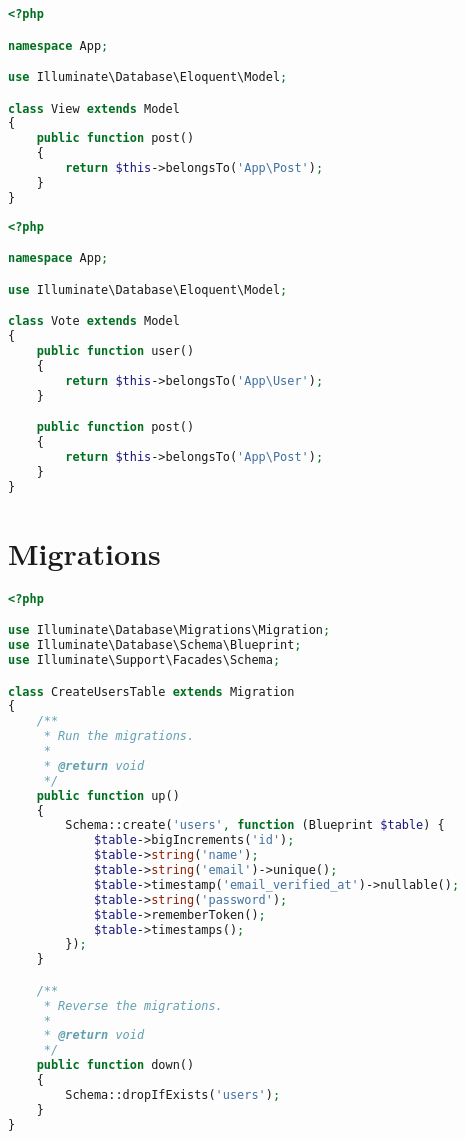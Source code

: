 \documentclass[11pt, oneside]{article}   	%
\begin{document}
\begin{lstlisting}[showstringspaces=false, title=View.java, language=PHP, frame=single]
<?php

namespace App;

use Illuminate\Database\Eloquent\Model;

class View extends Model
{
    public function post()
    {
        return $this->belongsTo('App\Post');
    }
}
\end{lstlisting}

\begin{lstlisting}[showstringspaces=false, title=Vote.java, language=PHP, frame=single]
<?php

namespace App;

use Illuminate\Database\Eloquent\Model;

class Vote extends Model
{
    public function user()
    {
        return $this->belongsTo('App\User');
    }

    public function post()
    {
        return $this->belongsTo('App\Post');
    }
}
\end{lstlisting}

\section{Migrations}

\begin{lstlisting}[showstringspaces=false, title=CreateUsersTable.java, language=PHP, frame=single]
<?php

use Illuminate\Database\Migrations\Migration;
use Illuminate\Database\Schema\Blueprint;
use Illuminate\Support\Facades\Schema;

class CreateUsersTable extends Migration
{
    /**
     * Run the migrations.
     *
     * @return void
     */
    public function up()
    {
        Schema::create('users', function (Blueprint $table) {
            $table->bigIncrements('id');
            $table->string('name');
            $table->string('email')->unique();
            $table->timestamp('email_verified_at')->nullable();
            $table->string('password');
            $table->rememberToken();
            $table->timestamps();
        });
    }

    /**
     * Reverse the migrations.
     *
     * @return void
     */
    public function down()
    {
        Schema::dropIfExists('users');
    }
}
\end{lstlisting}
\end{document}

